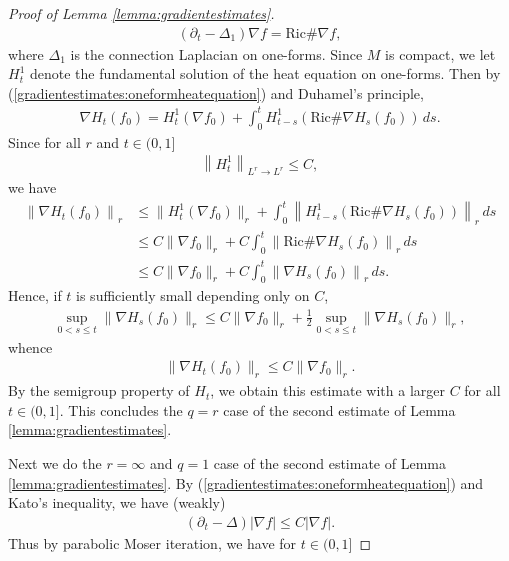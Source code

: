 \documentclass[12pt]{amsart}
\renewcommand{\1}{{\mathbf 1}}
\theoremstyle{others}
\numberwithin{equation}{section}
\begin{document}
\begin{proof}[Proof of Lemma \ref{lemma:gradientestimates}]
    \begin{align}\label{gradientestimates:oneformheatequation}
        (\partial_t - \Delta_1)\nabla f = \text{Ric} \# \nabla f,
    \end{align} where \(\Delta_1\) is the connection Laplacian on one-forms. Since \(M\) is compact, we let \(H_t^1\) denote the fundamental solution of the heat equation on one-forms. Then by (\ref{gradientestimates:oneformheatequation}) and Duhamel's principle,
   \begin{align*}
       \nabla H_t(f_0) = H_t^1(\nabla f_0) + \int_0^t H_{t-s}^1 \left(\text{Ric} \# \nabla H_s( f_0)\right) \, ds.
   \end{align*} Since for all \(r\) and \(t \in (0, 1]\)
   \begin{align*}
       \left\|H_t^1\right\|_{L^r \to L^r} \leq C,
   \end{align*} we have
   \begin{align*}
       \left\|\nabla H_t(f_0)\right\|_r &\leq \|H_t^1(\nabla f_0)\|_r + \int_0^t \left\|H_{t-s}^1\left(\text{Ric} \# \nabla H_s( f_0)\right)\right\|_r \, ds \\
       &\leq C\|\nabla f_0\|_r + C\int_0^t \left\|\text{Ric} \# \nabla H_s( f_0)\right\|_r \, ds \\
       &\leq C\|\nabla f_0\|_r + C\int_0^t \left\|\nabla H_s(f_0)\right\|_r \, ds.
   \end{align*} Hence, if \(t\) is sufficiently small depending only on \(C\),
   \begin{align*}
       \sup_{0 < s \leq t} \|\nabla H_s(f_0)\|_r \leq C\|\nabla f_0\|_r + \frac{1}{2}\sup_{0 < s \leq t} \|\nabla H_s(f_0)\|_r,
   \end{align*} whence
   \begin{align}\label{gradientestimates:LrLrbound}
       \|\nabla H_t(f_0)\|_r \leq C\|\nabla f_0\|_r.
   \end{align} By the semigroup property of \(H_t\), we obtain this estimate with a larger \(C\) for all \(t \in (0, 1]\). This concludes the \(q = r\) case of the second estimate of Lemma \ref{lemma:gradientestimates}. \par 
   Next we do the \(r = \infty\) and \(q = 1\) case of the second estimate of Lemma \ref{lemma:gradientestimates}. By (\ref{gradientestimates:oneformheatequation}) and Kato's inequality, we have (weakly) 
    \begin{align}\label{gradientestimates:oneformheatinequality}
        (\partial_t - \Delta)|\nabla f| \leq C|\nabla f|.
    \end{align} Thus by parabolic Moser iteration, we have for \(t \in (0, 1]\)

\end{proof}
\end{document}
